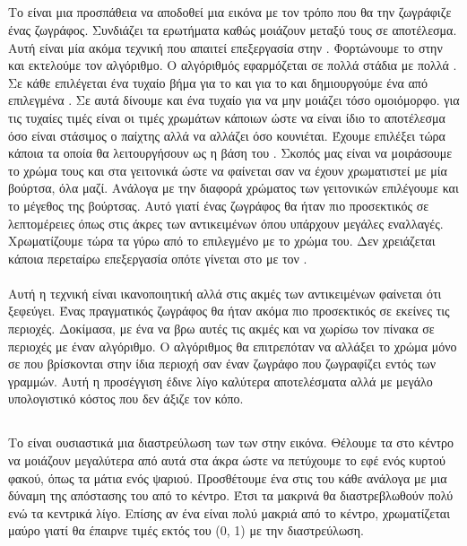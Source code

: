 \documentclass[11pt]{scrartcl} %
\begin{document}
\subsection{}
Το  είναι μια προσπάθεια να αποδοθεί μια εικόνα με τον τρόπο που θα την ζωγράφιζε ένας ζωγράφος.
Συνδιάζει τα ερωτήματα  καθώς μοιάζουν μεταξύ τους σε αποτέλεσμα. Αυτή είναι μία ακόμα τεχνική που απαιτεί
επεξεργασία στην . Φορτώνουμε το  στην  και εκτελούμε τον αλγόριθμο. \cite{Painterly}
Ο αλγόριθμός εφαρμόζεται σε πολλά στάδια με πολλά . Σε κάθε  επιλέγεται ένα τυχαίο βήμα 
για το  και για το  και δημιουργούμε ένα  από επιλεγμένα . Σε αυτά δίνουμε και ένα τυχαίο
 για να μην μοιάζει τόσο ομοιόμορφο.  για τις τυχαίες τιμές είναι οι τιμές χρωμάτων κάποιων 
ώστε να είναι ίδιο το αποτέλεσμα όσο είναι στάσιμος ο παίχτης αλλά να αλλάζει όσο κουνιέται.
Έχουμε επιλέξει τώρα κάποια  τα οποία θα λειτουργήσουν ως η βάση
του . Σκοπός μας είναι να μοιράσουμε το χρώμα τους και στα γειτονικά  ώστε να φαίνεται
σαν να έχουν χρωματιστεί με μία βούρτσα, όλα μαζί. Ανάλογα με την διαφορά χρώματος των γειτονικών  επιλέγουμε και το
μέγεθος της βούρτσας. Αυτό γιατί ένας ζωγράφος θα ήταν πιο προσεκτικός σε λεπτομέρειες όπως στις άκρες των αντικειμένων όπου
υπάρχουν μεγάλες εναλλαγές. Χρωματίζουμε τώρα τα  γύρω από το επιλεγμένο με το χρώμα του. Δεν χρειάζεται κάποια
περεταίρω επεξεργασία οπότε γίνεται  στο  με τον .
\\\\
Αυτή η τεχνική είναι ικανοποιητική αλλά στις ακμές των αντικειμένων φαίνεται ότι ξεφεύγει. Ένας πραγματικός ζωγράφος θα ήταν ακόμα
πιο προσεκτικός σε εκείνες τις περιοχές. Δοκίμασα, με ένα  να βρω αυτές τις ακμές και να χωρίσω τον πίνακα σε περιοχές
με έναν  αλγόριθμο. Ο  αλγόριθμος θα επιτρεπόταν να αλλάξει το χρώμα μόνο σε  που βρίσκονται 
στην ίδια περιοχή σαν έναν ζωγράφο που ζωγραφίζει εντός των γραμμών. Αυτή η προσέγγιση έδινε λίγο καλύτερα αποτελέσματα 
αλλά με μεγάλο υπολογιστικό κόστος που δεν άξιζε τον κόπο.
\clearpage

\subsection{}
Το  είναι ουσιαστικά μια διαστρεύλωση των  των  στην εικόνα. Θέλουμε τα  στο
κέντρο να μοιάζουν μεγαλύτερα από αυτά στα άκρα ώστε να πετύχουμε το εφέ ενός κυρτού φακού, όπως τα μάτια ενός ψαριού.
Προσθέτουμε ένα  στις  του κάθε  ανάλογα με μια δύναμη της απόστασης του από το κέντρο. Έτσι τα
μακρινά  θα διαστρεβλωθούν πολύ ενώ τα κεντρικά λίγο. Επίσης αν ένα  είναι πολύ μακριά από το κέντρο,
χρωματίζεται μαύρο γιατί θα έπαιρνε τιμές εκτός του (0, 1) με την διαστρεύλωση.
\end{document}
